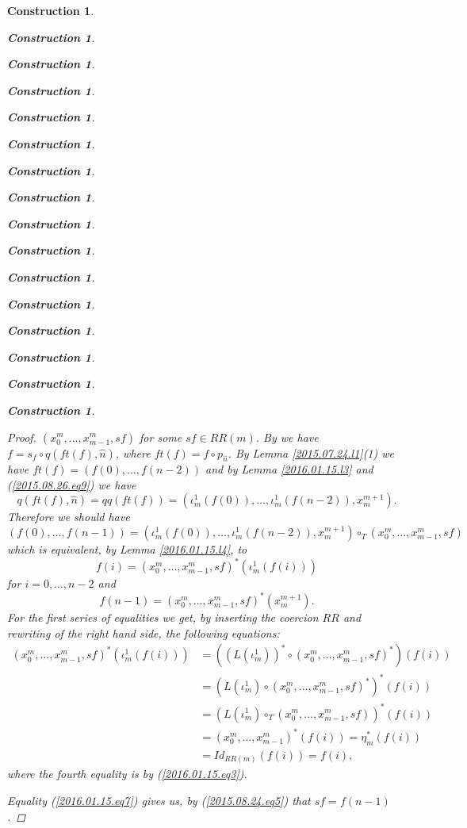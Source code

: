 \documentclass[onecolumn,12pt]{amsart}
\numberwithin{proposition}{subsection}
\newtheorem{construction}[proposition]{Construction}
\newcommand{\wh}{\widehat}
\newcommand{\mbind}[1]{{#1^*}}
\newcommand{\hc}{\circ_{T}}
\begin{document}
\begin{construction}
\begin{construction}
\begin{construction}
\begin{construction}
\begin{construction}
\begin{construction}
\begin{construction}
\begin{construction}
\begin{construction}
\begin{construction}
\begin{construction}
\begin{construction}
\begin{construction}
\begin{construction}
\begin{construction}
\begin{construction}
\begin{proof}
$(x_0^m,\dots,x_{m-1}^m,sf)$ for some $sf\in RR(m)$. By \cite[Definition
  2.3(3)]{Csubsystems} we have $f=s_f\circ q(ft(f),\wh{n})$, where $ft(f)=f\circ
p_{\wh{n}}$. By Lemma \ref{2015.07.24.l1}(1) we have
$ft(f)=(f(0),\dots,f(n-2))$ and by Lemma \ref{2016.01.15.l3} and
(\ref{2015.08.26.eq9}) we have
%
\[q(ft(f),\wh{n})=qq(ft(f))=(\iota_m^1(f(0)),\dots,\iota_m^1(f(n-2)),x_{m}^{m+1}).\]
%
Therefore we should have
%
$$(f(0),\dots,f(n-1))=(\iota_m^1(f(0)),\dots,\iota_m^1(f(n-2)),x_{m}^{m+1})\hc (x_0^m,\dots,x_{m-1}^m,sf)$$
%
which is equivalent, by Lemma \ref{2016.01.15.l4}, to
%
\begin{equation}\label{2016.01.15.eq6}
f(i)=\mbind{(x_0^m,\dots,x_{m-1}^m,sf)}(\iota_m^1(f(i)))
\end{equation}%
%
for $i=0,\dots,n-2$ and 
%
\begin{equation}\label{2016.01.15.eq7}
f(n-1)=\mbind{(x_0^m,\dots,x_{m-1}^m,sf)}(x_{m}^{m+1}).
\end{equation}%
%
For the first series of equalities we get, by inserting the coercion $RR$ and
rewriting of the right hand side, the following equations:
%
\begin{equation*}
  \begin{split}
    \mbind{(x_0^m,\dots,x_{m-1}^m,sf)}(\iota_m^1(f(i)))
    &=
    (\mbind{(L(\iota_m^1))}\circ \mbind{(x_0^m,\dots,x_{m-1}^m,sf)})(f(i))
    \\&=
    \mbind{(L(\iota_m^1)\circ \mbind{(x_0^m,\dots,x_{m-1}^m,sf)})}(f(i))
    \\&=
    \mbind{(L(\iota_m^1)\hc (x_0^m,\dots,x_{m-1}^m,sf))}(f(i))
    \\&=
    \mbind{(x_0^m,\dots,x_{m-1}^m)}(f(i))=\mbind{\eta_{m}}(f(i))
    \\&=
    Id_{RR(m)}(f(i))=f(i),
  \end{split}
\end{equation*}
%
where the fourth equality is by (\ref{2016.01.15.eq3}). 

Equality (\ref{2016.01.15.eq7}) gives us, by (\ref{2015.08.24.eq5}) that $sf=f(n-1)$.
\end{proof}
%
%


\end{construction}
\end{construction}
\end{construction}
\end{construction}
\end{construction}
\end{construction}
\end{construction}
\end{construction}
\end{construction}
\end{construction}
\end{construction}
\end{construction}
\end{construction}
\end{construction}
\end{construction}
\end{construction}
\end{document}
